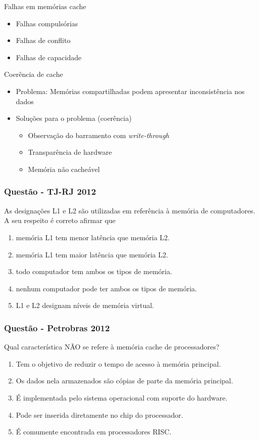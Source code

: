\documentclass[aspectratio=169,
				xcolor=table]{beamer}
\begin{document}
	\begin{frame}{Falhas em memórias cache}
		\begin{itemize}
			\item Falhas compulsórias
			\item Falhas de conflito
			\item Falhas de capacidade
		\end{itemize}
	\end{frame}	

	\begin{frame}{Coerência de cache}
		\begin{itemize}
			\item \alert{Problema:} Memórias compartilhadas podem apresentar inconsistência nos dados
			\vspace{1em}
			\item Soluções para o problema (coerência)
			\begin{itemize}
				\item Observação do barramento com \textit{write-through}
				\item Transparência de hardware
				\item Memória não cacheável
			\end{itemize}
		\end{itemize}
	\end{frame}
	
	\begin{frame}
		\frametitle{Questão - TJ-RJ 2012}
		As designações L1 e L2 são utilizadas em referência à memória de computadores. A seu respeito é correto afirmar que 
		\begin{enumerate}[a]
			\large
			\item memória L1 tem menor latência que memória L2.
			\item memória L1 tem maior latência que memória L2.
			\item todo computador tem ambos os tipos de memória.
			\item nenhum computador pode ter ambos os tipos de memória.
			\item L1 e L2 designam níveis de memória virtual.
		\end{enumerate}
	\end{frame}
	
	\begin{frame}
		\frametitle{Questão - Petrobras 2012}
		Qual característica NÃO se refere à memória cache de processadores?
		
		\begin{enumerate}[a]
			\large
			\item Tem o objetivo de reduzir o tempo de acesso à memória principal.
			\item Os dados nela armazenados são cópias de parte da memória principal.
			\item É implementada pelo sistema operacional com suporte do hardware.
			\item Pode ser inserida diretamente no chip do processador.
			\item É comumente encontrada em processadores RISC.
		\end{enumerate}
	\end{frame}
\end{document}
